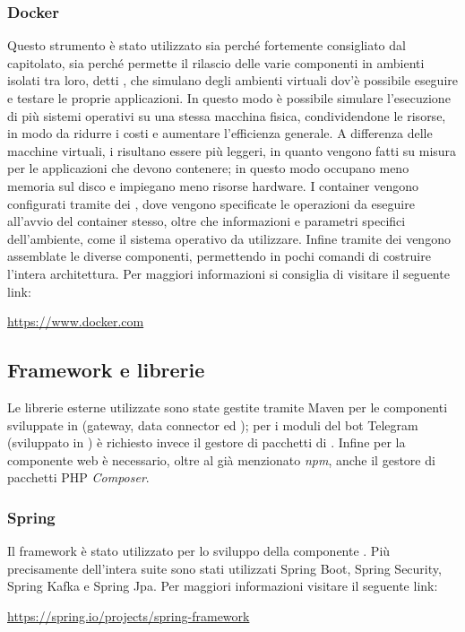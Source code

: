 		\subsubsection{Docker}
			Questo strumento è stato utilizzato sia perché fortemente consigliato dal capitolato, sia perché permette il rilascio delle varie componenti in ambienti isolati tra loro, detti , che simulano degli ambienti virtuali dov'è possibile eseguire e testare le proprie applicazioni.
			\newline
			In questo modo è possibile simulare l'esecuzione di più sistemi operativi su una stessa macchina fisica, condividendone le risorse, in modo da ridurre i costi e aumentare l'efficienza generale.
			\newline
			A differenza delle macchine virtuali, i  risultano essere più leggeri, in quanto vengono fatti su misura per le applicazioni che devono contenere; in questo modo occupano meno memoria sul disco e impiegano meno risorse hardware.
			\newline
			I container vengono configurati tramite dei , dove vengono specificate le operazioni da eseguire all'avvio del container stesso, oltre che informazioni e parametri specifici dell'ambiente, come il sistema operativo  da utilizzare. Infine tramite dei  vengono assemblate le diverse componenti, permettendo in pochi comandi di costruire l'intera architettura.
			\newline
			Per maggiori informazioni si consiglia di visitare il seguente link:
			\newline
			\begin{center}
				\url{https://www.docker.com}
			\end{center}
	\subsection{Framework e librerie}
		Le librerie esterne utilizzate sono state gestite tramite Maven per le componenti sviluppate in  (gateway, data connector ed ); per i moduli del bot Telegram (sviluppato in ) è richiesto invece il gestore di pacchetti di  . Infine per la componente web è necessario, oltre al già menzionato \textit{npm}, anche il gestore di pacchetti PHP \textit{Composer}.
		\subsubsection{Spring}
			Il framework  è stato utilizzato per lo sviluppo della componente . Più precisamente dell'intera suite sono stati utilizzati Spring Boot, Spring Security, Spring Kafka e Spring Jpa.
			\newline
			Per maggiori informazioni visitare il seguente link:
			\newline
			\begin{center}
				\url{https://spring.io/projects/spring-framework}
			\end{center}
